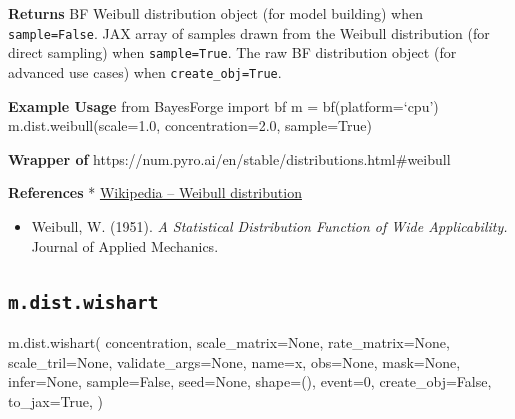 \documentclass[
  letterpaper,
  DIV=11,
  numbers=noendperiod]{scrartcl}
\newenvironment{Shaded}{\begin{snugshade}}{\end{snugshade}}
\newcommand{\DecValTok}[1]{\textcolor[rgb]{0.68,0.00,0.00}{#1}}
\newcommand{\NormalTok}[1]{\textcolor[rgb]{0.00,0.23,0.31}{#1}}
\newcommand{\OperatorTok}[1]{\textcolor[rgb]{0.37,0.37,0.37}{#1}}
\newcommand{\StringTok}[1]{\textcolor[rgb]{0.13,0.47,0.30}{#1}}
\newcommand{\VariableTok}[1]{\textcolor[rgb]{0.07,0.07,0.07}{#1}}
\providecommand{\tightlist}{%
  \setlength{\itemsep}{0pt}\setlength{\parskip}{0pt}}\usepackage{longtable,booktabs,array}
\begin{document}
\textbf{Returns} BF Weibull distribution object (for model building)
when \texttt{sample=False}. JAX array of samples drawn from the Weibull
distribution (for direct sampling) when \texttt{sample=True}. The raw BF
distribution object (for advanced use cases) when
\texttt{create\_obj=True}.

\textbf{Example Usage} from BayesForge import bf m = bf(platform=`cpu')
m.dist.weibull(scale=1.0, concentration=2.0, sample=True)

\textbf{Wrapper of}
https://num.pyro.ai/en/stable/distributions.html\#weibull

\textbf{References} *
\href{https://en.wikipedia.org/wiki/Weibull_distribution\#Probability_density_function}{Wikipedia
-- Weibull distribution}

\begin{itemize}
\tightlist
\item
  Weibull, W. (1951). \emph{A Statistical Distribution Function of Wide
  Applicability.} Journal of Applied Mechanics.
\end{itemize}

\subsection{\texorpdfstring{\texttt{m.dist.wishart}}{m.dist.wishart}}\label{wishart}

\begin{Shaded}
\begin{Highlighting}[]
\NormalTok{m.dist.wishart(}
\NormalTok{    concentration,}
\NormalTok{    scale\_matrix}\OperatorTok{=}\VariableTok{None}\NormalTok{,}
\NormalTok{    rate\_matrix}\OperatorTok{=}\VariableTok{None}\NormalTok{,}
\NormalTok{    scale\_tril}\OperatorTok{=}\VariableTok{None}\NormalTok{,}
\NormalTok{    validate\_args}\OperatorTok{=}\VariableTok{None}\NormalTok{,}
\NormalTok{    name}\OperatorTok{=}\StringTok{\textquotesingle{}x\textquotesingle{}}\NormalTok{,}
\NormalTok{    obs}\OperatorTok{=}\VariableTok{None}\NormalTok{,}
\NormalTok{    mask}\OperatorTok{=}\VariableTok{None}\NormalTok{,}
\NormalTok{    infer}\OperatorTok{=}\VariableTok{None}\NormalTok{,}
\NormalTok{    sample}\OperatorTok{=}\VariableTok{False}\NormalTok{,}
\NormalTok{    seed}\OperatorTok{=}\VariableTok{None}\NormalTok{,}
\NormalTok{    shape}\OperatorTok{=}\NormalTok{(),}
\NormalTok{    event}\OperatorTok{=}\DecValTok{0}\NormalTok{,}
\NormalTok{    create\_obj}\OperatorTok{=}\VariableTok{False}\NormalTok{,}
\NormalTok{    to\_jax}\OperatorTok{=}\VariableTok{True}\NormalTok{,}
\NormalTok{)}
\end{Highlighting}
\end{Shaded}
\end{document}
